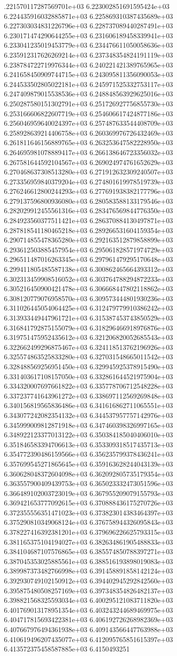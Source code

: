 .221570117287569701e+03	6.223002851691595424e+03	6.224435916032885871e+03	6.225869310387435689e+03	6.227303034831226796e+03	6.228737089440287491e+03	6.230171474290644255e+03	6.231606189458339941e+03	6.233041235019453779e+03	6.234476611050058636e+03	6.235912317626269214e+03	6.237348354824191119e+03	6.238784722719976344e+03	6.240221421389765965e+03	6.241658450909744715e+03	6.243095811356090053e+03	6.244533502805022181e+03	6.245971525332753117e+03	6.247409879015538536e+03	6.248848563929625016e+03	6.250287580151302791e+03	6.251726927756855730e+03	6.253166606822607719e+03	6.254606617424877186e+03	6.256046959640024397e+03	6.257487633544408709e+03	6.258928639214406758e+03	6.260369976726432469e+03	6.261811646156889765e+03	6.263253647582228950e+03	6.264695981078889417e+03	6.266138646723356032e+03	6.267581644592104567e+03	6.269024974761652629e+03	6.270468637308513280e+03	6.271912632309240507e+03	6.273356959840379204e+03	6.274801619978519739e+03	6.276246612800244293e+03	6.277691938382177796e+03	6.279137596800936080e+03	6.280583588133179546e+03	6.282029912455561316e+03	6.283476569844776350e+03	6.284923560377511421e+03	6.286370884130497871e+03	6.287818541180465218e+03	6.289266531604159354e+03	6.290714855478365280e+03	6.292163512879858899e+03	6.293612503885457954e+03	6.295061828571974729e+03	6.296511487016263345e+03	6.297961479295170648e+03	6.299411805485587138e+03	6.300862465664393312e+03	6.302313459908516052e+03	6.303764788294872233e+03	6.305216450900421478e+03	6.306668447802118862e+03	6.308120779076958570e+03	6.309573444801930236e+03	6.311026445054064425e+03	6.312479779910386242e+03	6.313933449447961721e+03	6.315387453743850529e+03	6.316841792875155079e+03	6.318296466918976876e+03	6.319751475952435612e+03	6.321206820052685543e+03	6.322662499296875467e+03	6.324118513762196926e+03	6.325574863525833280e+03	6.327031548665011542e+03	6.328488569256951450e+03	6.329945925378915490e+03	6.331403617108157050e+03	6.332861644521975904e+03	6.334320007697661822e+03	6.335778706712548228e+03	6.337237741643961272e+03	6.338697112569269848e+03	6.340156819565836486e+03	6.341616862711065551e+03	6.343077242082354132e+03	6.344537957757142976e+03	6.345999009812871918e+03	6.347460398326997165e+03	6.348922123377013122e+03	6.350384185040406010e+03	6.351846583394706613e+03	6.353309318517435713e+03	6.354772390486159566e+03	6.356235799378436241e+03	6.357699545271865645e+03	6.359163628244043139e+03	6.360628048372604098e+03	6.362092805735179354e+03	6.363557900409439753e+03	6.365023332473051596e+03	6.366489102003723019e+03	6.367955209079155793e+03	6.369421653777092615e+03	6.370888436175270726e+03	6.372355556351471023e+03	6.373823014383464397e+03	6.375290810349068124e+03	6.376758944326095843e+03	6.378227416392381201e+03	6.379696226625793315e+03	6.381165375104194027e+03	6.382634861905488833e+03	6.384104687107576865e+03	6.385574850788397271e+03	6.387045353025885561e+03	6.388516193898019083e+03	6.389987373482766998e+03	6.391458891858142124e+03	6.392930749102150912e+03	6.394402945292842560e+03	6.395875480508257169e+03	6.397348354826482137e+03	6.398821568325593034e+03	6.400295121083711820e+03	6.401769013178951354e+03	6.403243244689469975e+03	6.404717815693422381e+03	6.406192726268982369e+03	6.407667976494361938e+03	6.409143566447763988e+03	6.410619496207435077e+03	6.412095765851615397e+03	6.413572375458587885e+03	6.4150493251